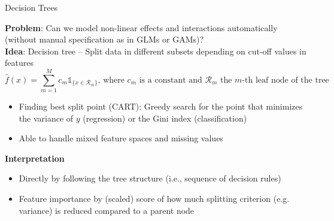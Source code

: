 \documentclass[11pt,compress,t,notes=noshow, aspectratio=169, xcolor=table]{beamer}
\begin{document}

\begin{frame}{Decision Trees }

\textbf{Problem}: Can we model non-linear effects and interactions automatically (without manual specification as in GLMs or GAMs)?\\
\medskip
\textbf{Idea}: Decision tree -- Split data in different subsets depending on cut-off values in features 
$$
\hat f(x) = \sum_{m=1}^M c_m \mathds{1}_{\{x \in \mathcal{R}_m\}}\text{,  where $c_m$ is a constant and $\mathcal{R}_m$ the $m$-th leaf node of the tree}
$$

\begin{itemize}
    \item Finding best split point (CART): Greedy search for the point that minimizes the variance of $y$ (regression) or the Gini index (classification)
    \item Able to handle mixed feature spaces and missing values
\end{itemize}
\medskip
\pause
\textbf{Interpretation}
\begin{itemize}
    \item Directly by following the tree structure (i.e., sequence of decision rules)
    \item Feature importance by (scaled) score of how much splitting criterion (e.g. variance) is reduced compared to a parent node
\end{itemize}



\end{frame}
\end{document}
